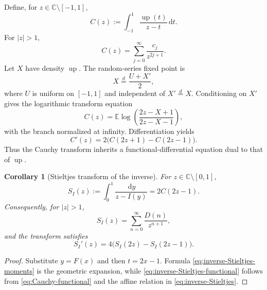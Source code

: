 \documentclass[11pt]{article}
\newtheorem{corollary}[theorem]{Corollary}
\theoremstyle{definition}
\theoremstyle{remark}
\DeclareMathOperator{\upf}{up}
\newcommand{\C}{\mathbb C}
\newcommand{\E}{\mathbb E}
\newcommand{\dd}{\,\mathrm d}
\newcommand{\abs}[1]{\lvert#1\rvert}
\begin{document}
Define, for \(z\in\C\setminus[-1,1]\),
\begin{equation}
 C(z):=\int_{-1}^1\frac{\upf(t)}{z-t}\dd t.               \label{eq:Cauchy-def}
\end{equation}
For \(\abs{z}>1\),
\begin{equation}
 C(z)=\sum_{j=0}^{\infty}\frac{c_j}{z^{2j+1}}.            \label{eq:Cauchy-moment}
\end{equation}
Let \(X\) have density \(\upf\).  The random-series fixed point is
\begin{equation}
 X\stackrel{d}{=}\frac{U+X'}2,                               \label{eq:random-fixed-point}
\end{equation}
where \(U\) is uniform on \([-1,1]\) and independent of \(X'\stackrel{d}{=}X\).
Conditioning on \(X'\) gives the logarithmic transform equation
\begin{equation}
 \boxed{
 C(z)=\E\log\!\left(\frac{2z-X+1}{2z-X-1}\right),
 }                                                        \label{eq:Cauchy-log}
\end{equation}
with the branch normalized at infinity.  Differentiation yields
\begin{equation}
 C'(z)=2\bigl(C(2z+1)-C(2z-1)\bigr).                     \label{eq:Cauchy-functional}
\end{equation}
Thus the Cauchy transform inherits a functional-differential equation dual to that of
\(\upf\).

\begin{corollary}[Stieltjes transform of the inverse]
\label{cor:inverse-Stieltjes}
For \(z\in\C\setminus[0,1]\),
\begin{equation}
 \boxed{
 S_I(z):=\int_0^1\frac{\dd y}{z-I(y)}=2C(2z-1).
 }                                                          \label{eq:inverse-Stieltjes}
\end{equation}
Consequently, for \(\abs z>1\),
\begin{equation}
 S_I(z)=\sum_{n=0}^{\infty}\frac{D(n)}{z^{n+1}},           \label{eq:inverse-Stieltjes-moments}
\end{equation}
and the transform satisfies
\begin{equation}
 S_I'(z)=4\bigl(S_I(2z)-S_I(2z-1)\bigr).                  \label{eq:inverse-Stieltjes-functional}
\end{equation}
\end{corollary}

\begin{proof}
Substitute \(y=F(x)\) and then \(t=2x-1\).  Formula
\eqref{eq:inverse-Stieltjes-moments} is the geometric expansion, while
\eqref{eq:inverse-Stieltjes-functional} follows from
\eqref{eq:Cauchy-functional} and the affine relation in
\eqref{eq:inverse-Stieltjes}.
\end{proof}
\end{document}
